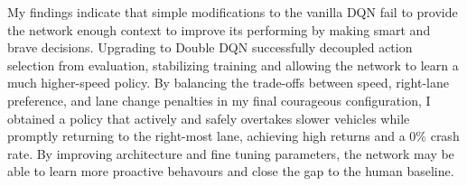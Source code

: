 \documentclass{article}
\begin{document}
My findings indicate that simple modifications to the vanilla DQN fail to provide the network enough context to improve its performing by making smart and brave decisions. Upgrading to Double DQN successfully decoupled action selection from evaluation, stabilizing training and allowing the network to learn a much higher-speed policy. By balancing the trade-offs between speed, right-lane preference, and lane change penalties in my final courageous configuration, I obtained a policy that actively and safely overtakes slower vehicles while promptly returning to the right-most lane, achieving high returns and a $0\%$ crash rate.
By improving architecture and fine tuning parameters, the network may be able to learn more proactive behavours and close the gap to the human baseline.



\end{document}
